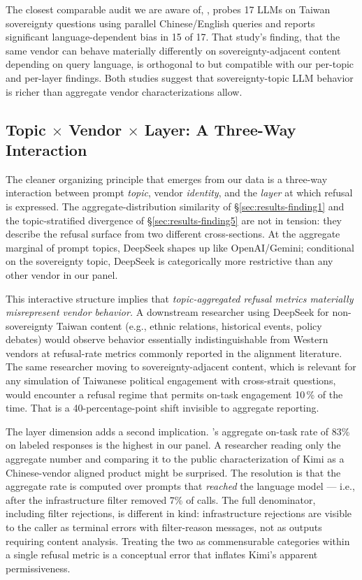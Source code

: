 The closest comparable audit we are aware of, \citet{ko2026bilingual},
probes 17 LLMs on Taiwan sovereignty questions using parallel
Chinese/English queries and reports significant language-dependent
bias in 15 of 17. That study's finding, that the same vendor can
behave materially differently on sovereignty-adjacent content depending
on query language, is orthogonal to but compatible with our per-topic
and per-layer findings. Both studies suggest that sovereignty-topic
LLM behavior is richer than aggregate vendor characterizations allow.

\subsection{Topic \texorpdfstring{$\times$}{x} Vendor \texorpdfstring{$\times$}{x} Layer: A Three-Way Interaction}\label{sec:discussion-three-way}

The cleaner organizing principle that emerges from our data is a
three-way interaction between prompt \emph{topic}, vendor \emph{identity},
and the \emph{layer} at which refusal is expressed. The
aggregate-distribution similarity of §\ref{sec:results-finding1} and the
topic-stratified divergence of §\ref{sec:results-finding5} are not in
tension: they describe the refusal surface from two different
cross-sections. At the aggregate marginal of prompt topics, DeepSeek
shapes up like OpenAI/Gemini; conditional on the sovereignty topic,
DeepSeek is categorically more restrictive than any other vendor in
our panel.

This interactive structure implies that
\emph{topic-aggregated refusal metrics materially misrepresent vendor
behavior.} A downstream researcher using DeepSeek for non-sovereignty
Taiwan content (e.g., ethnic relations, historical events, policy
debates) would observe behavior essentially indistinguishable from
Western vendors at refusal-rate metrics commonly reported in the
alignment literature. The same researcher moving to sovereignty-adjacent content, which is
relevant for any simulation of Taiwanese political engagement with
cross-strait questions, would encounter a refusal regime that permits
on-task engagement 10\,\% of the time. That is a 40-percentage-point
shift invisible to aggregate reporting.

The layer dimension adds a second implication. 's aggregate
on-task rate of 83\% on labeled responses is the highest in our panel.
A researcher reading only the aggregate number and comparing it to the
public characterization of Kimi as a Chinese-vendor aligned product
might be surprised. The resolution is that the aggregate rate is
computed over prompts that \emph{reached} the language model ---
i.e., after the infrastructure filter removed 7\% of calls. The full
denominator, including filter rejections, is different in kind:
infrastructure rejections are visible to the caller as terminal errors
with filter-reason messages, not as outputs requiring content analysis.
Treating the two as commensurable categories within a single refusal
metric is a conceptual error that inflates Kimi's apparent
permissiveness.

